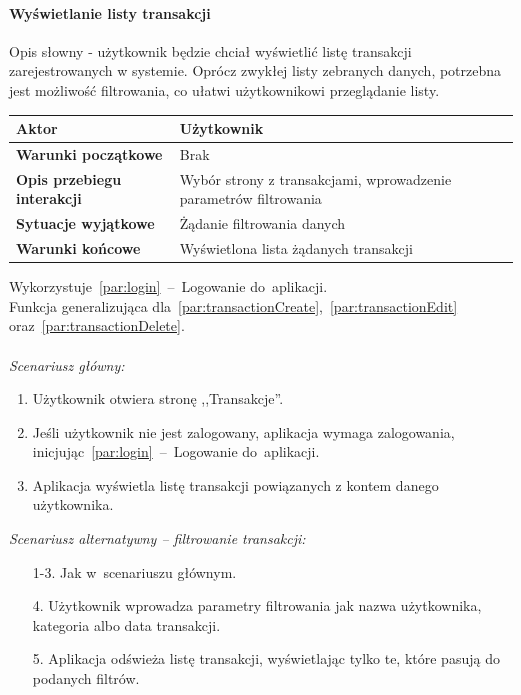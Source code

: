 \paragraph{Wyświetlanie listy transakcji\newline}
Opis słowny - użytkownik będzie chciał wyświetlić listę transakcji zarejestrowanych w systemie.
Oprócz zwykłej listy zebranych danych, potrzebna jest możliwość filtrowania, co ułatwi użytkownikowi
przeglądanie listy.
\begin{longtable}{|p{5cm}|p{7cm}|}
 	\hline
	\textbf{Aktor} & Użytkownik \\
	\hline
	\textbf{Warunki początkowe} & Brak
	\\
	\hline
	\textbf{Opis przebiegu interakcji} & Wybór strony z transakcjami,
	wprowadzenie parametrów filtrowania
	\\
	\hline
	\textbf{Sytuacje wyjątkowe} & Żądanie filtrowania danych
	\\
	\hline
	\textbf{Warunki końcowe} & Wyświetlona lista żądanych transakcji
	\\
	\hline
 \end{longtable}
Wykorzystuje~\ref{par:login}~--~Logowanie do~aplikacji.\\
\indent Funkcja generalizująca dla~\ref{par:transactionCreate},~\ref{par:transactionEdit} oraz~\ref{par:transactionDelete}.\\\\
\textit{Scenariusz główny:}
\begin{enumerate}
  \item Użytkownik otwiera stronę ,,Transakcje''.
  \item Jeśli użytkownik nie jest zalogowany, aplikacja wymaga zalogowania, inicjując~\ref{par:login}~--~Logowanie do~aplikacji.
  \item Aplikacja wyświetla listę transakcji powiązanych z kontem danego użytkownika.
\end{enumerate}
\textit{Scenariusz alternatywny -- filtrowanie transakcji:}
\begin{enumerate}
  \item[1-3.] Jak w~scenariuszu głównym.
  \item[4.] Użytkownik wprowadza parametry filtrowania jak nazwa użytkownika, kategoria albo data transakcji.
  \item[5.] Aplikacja odświeża listę transakcji, wyświetlając tylko te, które pasują do podanych filtrów.
\end{enumerate}


